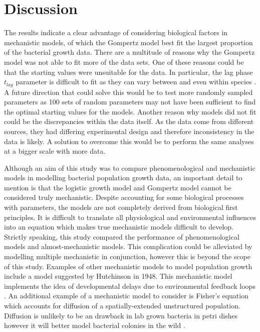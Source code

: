 \documentclass[11pt]{article}
\begin{document}
	
    \section{Discussion}
    The results indicate a clear advantage of considering biological factors in mechanistic models, of which the Gompertz model best fit the largest proportion of the bacterial growth data. There are a multitude of reasons why the Gompertz model was not able to fit more of the data sets. One of these reasons could be that the starting values were unsuitable for the data. In particular, the lag phase $t_{lag}$ parameter is difficult to fit as they can vary between and even within species \citep{zwietering1992comparison}. A future direction that could solve this would be to test more randomly sampled parameters as 100 sets of random parameters may not have been sufficient to find the optimal starting values for the models. Another reason why models did not fit could be the discrepancies within the data itself. As the data come from different sources, they had differing experimental design and therefore inconsistency in the data is likely. A solution to overcome this would be to perform the same analyses at a bigger scale with more data.
    
   Although an aim of this study was to compare phenomenological and mechanistic models in modelling bacterial population growth data, an important detail to mention is that the logistic growth model and Gompertz model cannot be considered truly mechanistic. Despite accounting for some biological processes with parameters, the models are not completely derived from biological first principles. It is difficult to translate all physiological and environmental influences into an equation which makes true mechanistic models difficult to develop. Strictly speaking, this study compared the performance of phenomenological models and almost-mechanistic models. This complication could be alleviated by modelling multiple mechanistic in conjunction, however this is beyond the scope of this study. Examples of other mechanistic models to model population growth include a model suggested by Hutchinson in 1948. This mechanistic model implements the idea of developmental delays due to environmental feedback loops \citep{hutchinson1948circular}. An additional example of a mechanistic model to consider is Fisher's equation which accounts for diffusion of a spatially-extended unstructured population. Diffusion is unlikely to be an drawback in lab grown bacteria in petri dishes however it will better model bacterial colonies in the wild \citep{fisher1937wave}.
    
\end{document}
